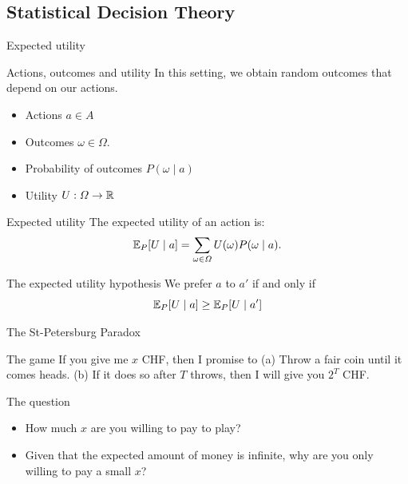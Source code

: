 \documentclass[smaller]{beamer}
\begin{document}
\subsection{Statistical Decision Theory}
\label{sec:org8b0f6ac}

\begin{frame}[label={sec:org1b29b4a}]{Expected utility}
\begin{block}{Actions, outcomes and utility}
In this setting, we obtain random outcomes that depend on our actions.
\begin{itemize}
\item Actions \(a \in A\)
\item Outcomes \(\omega \in \Omega\).
\item Probability of outcomes \(P(\omega \mid a)\)
\item Utility \(U : \Omega \to \mathbb{R}\)
\end{itemize}
\end{block}
\begin{block}{Expected utility}
The expected utility of an action is:
\[
\mathop{\mbox{\ensuremath{\mathbb{E}}}}\nolimits_P[U \mid a] = \sum_{\omega \in \Omega} U(\omega) P(\omega \mid a).
\]
\end{block}

\begin{block}{The expected utility hypothesis}
We prefer \(a\) to \(a'\) if and only if
\[
\mathop{\mbox{\ensuremath{\mathbb{E}}}}\nolimits_P[U \mid a] \geq \mathop{\mbox{\ensuremath{\mathbb{E}}}}\nolimits_P[U \mid a']
\]
\end{block}
\end{frame}

\begin{frame}[label={sec:org809b666}]{The St-Petersburg Paradox}
\begin{block}{The game}
If you give me \(x\) CHF, then I promise to
(a) Throw a fair coin until it comes heads.
(b) If it does so after \(T\) throws, then I will give you \(2^T\) CHF.
\end{block}
\begin{block}{The question}
\begin{itemize}
\item How much \(x\) are you willing to pay to play?
\item Given that the expected amount of money is infinite, why are you only willing to pay a small \(x\)?
\end{itemize}
\end{block}
\end{frame}
\end{document}
